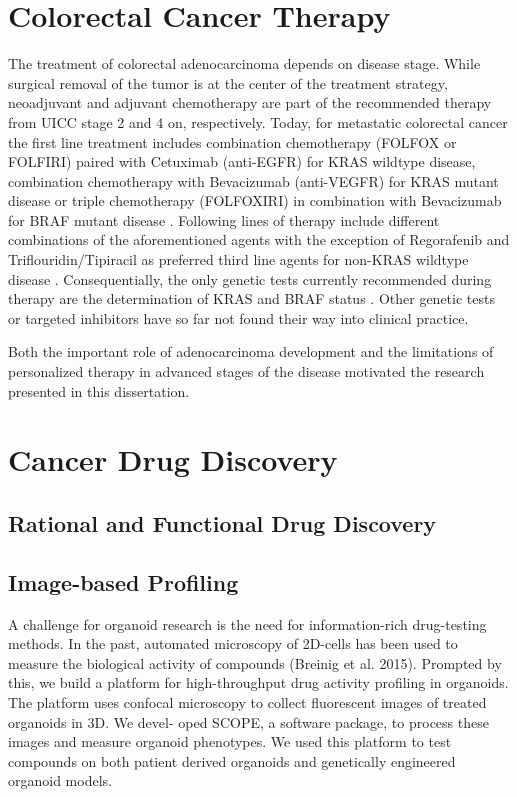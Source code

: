 \begin{flushleft}
\section{Colorectal Cancer Therapy}
The treatment of colorectal adenocarcinoma depends on disease stage. While surgical removal of the tumor is at the center of the treatment strategy, neoadjuvant and adjuvant chemotherapy are part of the recommended therapy from UICC stage 2 and 4 on, respectively. Today, for metastatic colorectal cancer the first line treatment includes combination chemotherapy (FOLFOX or FOLFIRI) paired with Cetuximab (anti-EGFR) for KRAS wildtype disease, combination chemotherapy with Bevacizumab (anti-VEGFR) for KRAS mutant disease or triple chemotherapy (FOLFOXIRI) in combination with Bevacizumab for BRAF mutant disease \cite{Cutsem}. Following lines of therapy include different combinations of the aforementioned agents with the exception of Regorafenib and Triflouridin/Tipiracil as preferred third line agents for non-KRAS wildtype disease \cite{Cutsem}. Consequentially, the only genetic tests currently recommended during therapy are the determination of KRAS and BRAF status \cite{Cutsem}. Other genetic tests or targeted inhibitors have so far not found their way into clinical practice.\par

Both the important role of adenocarcinoma development and the limitations of personalized therapy in advanced stages of the disease motivated the research presented in this dissertation.

\section{Cancer Drug Discovery}
\subsection{Rational and Functional Drug Discovery}
\subsection{Image-based Profiling}
A challenge for organoid research is the need for information-rich drug-testing methods. In the past, automated microscopy of 2D-cells has been used to measure the biological activity of compounds (Breinig et al. 2015). Prompted by this, we build a platform for high-throughput drug activity profiling in organoids. The platform uses confocal microscopy to collect fluorescent images of treated organoids in 3D. We devel- oped SCOPE, a software package, to process these images and measure organoid phenotypes. We used this platform to test compounds on both patient derived organoids and genetically engineered organoid models.


\end{flushleft}
